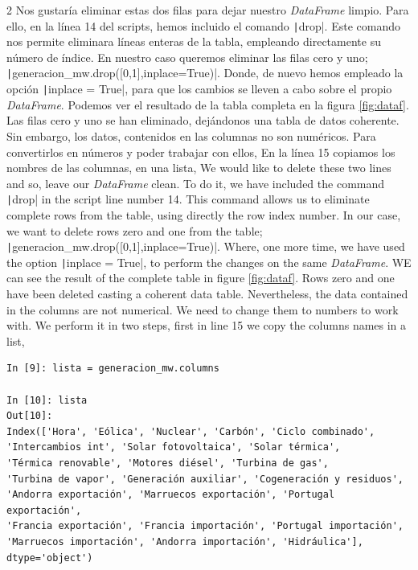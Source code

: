 \begin{paracol}{2}
Nos gustaría eliminar estas dos filas para dejar nuestro \emph{DataFrame} limpio. Para ello, en la línea 14 del scripts, hemos incluido el comando \texttt|drop|. Este comando nos permite eliminara líneas enteras de la tabla, empleando directamente su número de índice. En nuestro caso queremos eliminar las filas cero y uno; \texttt|generacion_mw.drop([0,1],inplace=True)|. Donde, de nuevo hemos empleado la opción \texttt|inplace = True|, para que los cambios se lleven a cabo sobre el propio 	\emph{DataFrame}. 
Podemos ver el resultado de la tabla completa en la figura \ref{fig:dataf}. Las filas cero y uno se han eliminado, dejándonos una tabla de datos coherente. 
Sin embargo, los datos, contenidos en las columnas no son numéricos. Para convertirlos en números y poder trabajar con ellos,
En la línea 15 copiamos los nombres de las columnas, en una lista, 
\switchcolumn
We would like to delete these two lines and so, leave our \emph{DataFrame} clean. To do it, we have included the command \texttt|drop| in the script line number 14. This command allows us to eliminate complete rows from the table, using directly the row index number. In our case, we want to delete rows zero and one from the table;\\ \texttt|generacion_mw.drop([0,1],inplace=True)|. Where, one more time, we have used the option  \texttt|inplace = True|, to perform the changes on the same \emph{DataFrame}. WE can see the result of the complete table in figure \ref{fig:dataf}. Rows zero and one have been deleted casting a coherent data table.
Nevertheless, the data contained in the columns are not numerical. We need to change them to numbers to work with. We perform it in two steps, first in line 15 we copy the columns names in a list,                  

\end{paracol}

\begin{center}
	\begin{minipage}{0.7\textwidth}
		\begin{verbatim}
In [9]: lista = generacion_mw.columns

In [10]: lista
Out[10]: 
Index(['Hora', 'Eólica', 'Nuclear', 'Carbón', 'Ciclo combinado',
'Intercambios int', 'Solar fotovoltaica', 'Solar térmica',
'Térmica renovable', 'Motores diésel', 'Turbina de gas',
'Turbina de vapor', 'Generación auxiliar', 'Cogeneración y residuos',
'Andorra exportación', 'Marruecos exportación', 'Portugal exportación',
'Francia exportación', 'Francia importación', 'Portugal importación',
'Marruecos importación', 'Andorra importación', 'Hidráulica'],
dtype='object')									 	
		\end{verbatim}
	\end{minipage}
\end{center}

